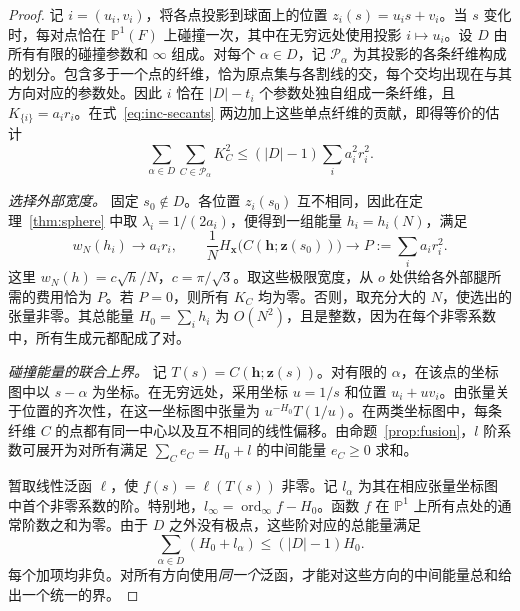 \begin{proof}
记 $i=(u_i,v_i)$，将各点投影到球面上的位置 $z_i(s)=u_i s+v_i$。当 $s$ 变化时，每对点恰在 $\mathbb P^1(F)$ 上碰撞一次，其中在无穷远处使用投影 $i\mapsto u_i$。设 $D$ 由所有有限的碰撞参数和 $\infty$ 组成。对每个 $\alpha\in D$，记 $\mathcal P_\alpha$ 为其投影的各条纤维构成的划分。包含多于一个点的纤维，恰为原点集与各割线的交，每个交均出现在与其方向对应的参数处。因此 $i$ 恰在 $|D|-t_i$ 个参数处独自组成一条纤维，且 $K_{\{i\}}=a_i r_i$。在式~\eqref{eq:inc-secants} 两边加上这些单点纤维的贡献，即得等价的估计
\begin{equation}\label{eq:inc-fibers}
   \sum_{\alpha\in D}\sum_{C\in\mathcal P_\alpha} K_C^2
             \le (|D|-1)\sum_i a_i^2 r_i^2 .
\end{equation}

\emph{选择外部宽度。}
固定 $s_0\notin D$。各位置 $z_i(s_0)$ 互不相同，因此在定理~\ref{thm:sphere} 中取 $\lambda_i=1/(2a_i)$，便得到一组能量 $h_i=h_i(N)$，满足
\begin{equation}\label{eq:inc-saturation}
 w_N(h_i)\longrightarrow a_i r_i,\qquad
 \frac{1}{N}H_{\mathbf x}\bigl(C(\mathbf h;\mathbf z(s_0))\bigr)
              \longrightarrow P:=\sum_i a_i r_i^2 .
\end{equation}
这里 $w_N(h)=c\sqrt h/N$，$c=\pi/\sqrt3$。取这些极限宽度，从 $o$ 处供给各外部腿所需的费用恰为 $P$。若 $P=0$，则所有 $K_C$ 均为零。否则，取充分大的 $N$，使选出的张量非零。其总能量 $H_0=\sum_i h_i$ 为 $O(N^2)$，且是整数，因为在每个非零系数中，所有生成元都配成了对。

\emph{碰撞能量的联合上界。}
记 $T(s)=C(\mathbf h;\mathbf z(s))$。对有限的 $\alpha$，在该点的坐标图中以 $s-\alpha$ 为坐标。在无穷远处，采用坐标 $u=1/s$ 和位置 $u_i+u v_i$。由张量关于位置的齐次性，在这一坐标图中张量为 $u^{-H_0}T(1/u)$。在两类坐标图中，每条纤维 $C$ 的点都有同一中心以及互不相同的线性偏移。由命题~\ref{prop:fusion}，$l$ 阶系数可展开为对所有满足 $\sum_C e_C=H_0+l$ 的中间能量 $e_C\ge0$ 求和。

暂取线性泛函 $\ell$，使 $f(s)=\ell(T(s))$ 非零。记 $l_\alpha$ 为其在相应张量坐标图中首个非零系数的阶。特别地，$l_\infty=\operatorname{ord}_\infty f-H_0$。函数 $f$ 在 $\mathbb P^1$ 上所有点处的通常阶数之和为零。由于 $D$ 之外没有极点，这些阶对应的总能量满足
\begin{equation}\label{eq:inc-orders}
  \sum_{\alpha\in D}(H_0+l_\alpha)\le (|D|-1) H_0 .
\end{equation}
每个加项均非负。对所有方向使用\emph{同一个}泛函，才能对这些方向的中间能量总和给出一个统一的界。


\end{proof}
